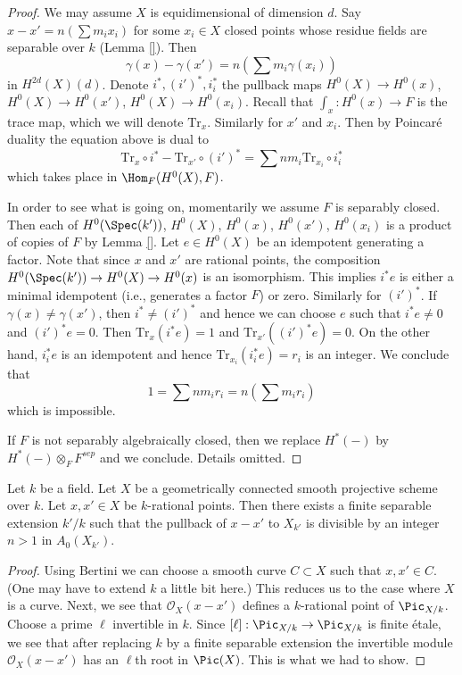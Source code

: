 \begin{proof}
We may assume $X$ is equidimensional of dimension $d$.
Say $x - x' = n(\sum m_i x_i)$ for some $x_i \in X$ closed points
whose residue fields are separable over $k$ (Lemma \ref{}).
Then
$$
\gamma(x) - \gamma(x') = n (\sum m_i \gamma(x_i))
$$
in $H^{2d}(X)(d)$. Denote $i^*, (i')^*, i_i^*$ the pullback maps
$H^0(X) \to H^0(x)$, $H^0(X) \to H^0(x')$, $H^0(X) \to H^0(x_i)$.
Recall that $\int_x : H^0(x) \to F$ is the trace map, which
we will denote $\text{Tr}_x$. Similarly for $x'$ and $x_i$.
Then by Poincar\'e duality the equation above is dual to
$$
\text{Tr}_x \circ i^* - \text{Tr}_{x'} \circ (i')^* =
\sum nm_i \text{Tr}_{x_i} \circ i_i^*
$$
which takes place in $\Hom_F(H^0(X), F)$.

\medskip\noindent
In order to see what is going on, momentarily we assume $F$ is separably closed.
Then each of $H^0(\Spec(k'))$, $H^0(X)$, $H^0(x)$, $H^0(x')$, $H^0(x_i)$
is a product of copies of $F$ by Lemma \ref{}.
Let $e \in H^0(X)$ be an idempotent generating a factor.
Note that since $x$ and $x'$ are rational points, the composition
$H^0(\Spec(k')) \to H^0(X) \to H^0(x)$ is an isomorphism.
This implies $i^*e$ is either a minimal idempotent (i.e.,
generates a factor $F$) or zero. Similarly for $(i')^*$.
If $\gamma(x) \not = \gamma(x')$, then $i^* \not = (i')^*$ and
hence we can choose $e$ such that $i^*e \not = 0$ and
$(i')^*e = 0$. Then $\text{Tr}_x(i^*e) = 1$ and $\text{Tr}_{x'}((i')^*e) = 0$.
On the other hand, $i_i^*e$ is an idempotent
and hence $\text{Tr}_{x_i}(i_i^*e) = r_i$ is an integer.
We conclude that
$$
1 = \sum n m_i r_i = n (\sum m_i r_i)
$$
which is impossible.

\medskip\noindent
If $F$ is not separably algebraically closed, then we replace
$H^*( - )$ by $H^*( - ) \otimes_F F^{sep}$ and we conclude.
Details omitted.
\end{proof}

\begin{lemma}
\label{lemma-divide-difference-points}
Let $k$ be a field. Let $X$ be a geometrically connected
smooth projective scheme over $k$. Let $x, x' \in X$ be $k$-rational points.
Then there exists a finite separable extension $k'/k$ such that
the pullback of $x - x'$ to $X_{k'}$
is divisible by an integer $n > 1$ in $A_0(X_{k'})$.
\end{lemma}

\begin{proof}
Using Bertini we can choose a smooth curve $C \subset X$
such that $x, x' \in C$. (One may have to extend $k$
a little bit here.) This reduces us to the case where
$X$ is a curve. Next, we see that $\mathcal{O}_X(x - x')$
defines a $k$-rational point of $\Pic_{X/k}$.
Choose a prime $\ell$ invertible in $k$. Since
$[\ell] : \Pic_{X/k} \to \Pic_{X/k}$ is finite \'etale,
we see that after replacing $k$ by a finite separable extension
the invertible module $\mathcal{O}_X(x - x')$ has an
$\ell$th root in $\Pic(X)$. This is what we had to show.
\end{proof}

